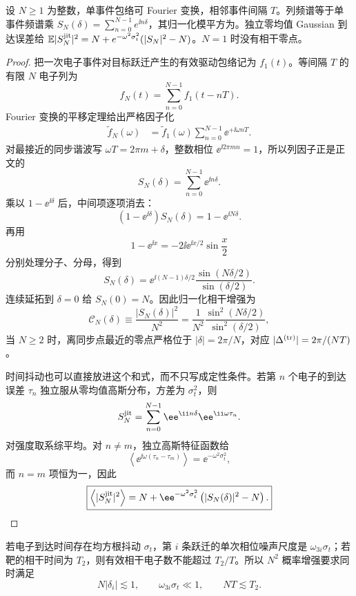 \begin{proposition}
设 $N\ge1$ 为整数，单事件包络可 Fourier 变换，相邻事件间隔 $T$。列频谱等于单事件频谱乘 $S_N(\delta)=\sum_{n=0}^{N-1}e^{\ii n\delta}$，其归一化模平方为。独立零均值 Gaussian 到达误差给 $\mathbb E|S_N^{\rm jit}|^2=N+e^{-\omega^2\sigma_t^2}(|S_N|^2-N)$。$N=1$ 时没有相干零点。
\end{proposition}
\begin{proof}
把一次电子事件对目标跃迁产生的有效驱动包络记为 $f_1(t)$。等间隔 $T$ 的有限 $N$ 电子列为
\[
f_N(t)=\sum_{n=0}^{N-1}f_1(t-nT).
\]
Fourier 变换的平移定理给出严格因子化
\begin{align*}
\widetilde f_N(\omega)
&=\widetilde f_1(\omega)
\sum_{n=0}^{N-1}\ee^{+\ii\omega nT}.
\end{align*}
对最接近的同步谐波写 $\omega T=2\pi m+\delta$，整数相位 $\ee^{\ii2\pi mn}=1$，所以列因子正是正文的
\[
S_N(\delta)=\sum_{n=0}^{N-1}\ee^{\ii n\delta}.
\]
乘以 $1-\ee^{\ii\delta}$ 后，中间项逐项消去：
\[
(1-\ee^{\ii\delta})S_N(\delta)=1-\ee^{\ii N\delta}.
\]
再用
\[
1-\ee^{\ii x}=-2\ii \ee^{\ii x/2}\sin\frac{x}{2}
\]
分别处理分子、分母，得到
\[
S_N(\delta)
=\ee^{\ii(N-1)\delta/2}
\frac{\sin(N\delta/2)}{\sin(\delta/2)}.
\]
连续延拓到 $\delta=0$ 给 $S_N(0)=N$。因此归一化相干增强为
\[
\mathcal C_N(\delta)
\equiv\frac{|S_N(\delta)|^2}{N^2}
=\frac1{N^2}
\frac{\sin^2(N\delta/2)}{\sin^2(\delta/2)},
\]
当 $N\ge2$ 时，离同步点最近的零点严格位于 $|\delta|=2\pi/N$，对应
$|\Delta^{({\rm tr})}|=2\pi/(NT)$。

时间抖动也可以直接放进这个和式，而不只写成定性条件。若第 $n$ 个电子的到达误差 $\tau_n$ 独立服从零均值高斯分布，方差为 $\sigma_t^2$，则
\[
S_N^{\rm jit}
=\sum_{n=0}^{N-1}
 \ee^{\ii n\delta}\ee^{\ii\omega\tau_n}.
\]
对强度取系综平均。对 $n\neq m$，独立高斯特征函数给
\[
\left\langle
 \ee^{\ii\omega(\tau_n-\tau_m)}
\right\rangle
=\ee^{-\omega^2\sigma_t^2},
\]
而 $n=m$ 项恒为一，因此
\[
\boxed{
\left\langle|S_N^{\rm jit}|^2\right\rangle
=N+\ee^{-\omega^2\sigma_t^2}
\left(|S_N(\delta)|^2-N\right).}
\]
\end{proof}


若电子到达时间存在均方根抖动 $\sigma_t$，第 $i$ 条跃迁的单次相位噪声尺度是 $\omega_{3i}\sigma_t$；若靶的相干时间为 $T_2$，则有效相干电子数不能超过 $T_2/T$。所以 $N^2$ 概率增强要求同时满足
\begin{equation*}
N|\delta_i|\lesssim1,
\qquad
\omega_{3i}\sigma_t\ll1,
\qquad
NT\lesssim T_2.
\end{equation*}

